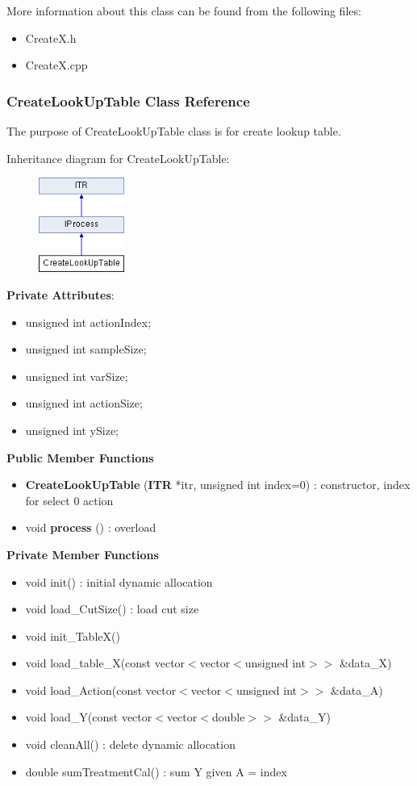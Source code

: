 \documentclass{article}
\begin{document}
More information about this class can be found from the following files:
\begin{itemize}
\item CreateX.h
\item CreateX.cpp
\end{itemize}


\subsubsection{CreateLookUpTable Class Reference}
The purpose of CreateLookUpTable class is for create lookup table.

Inheritance diagram for CreateLookUpTable:
\begin{figure}[H]
\centering
\includegraphics[width=0.25\textwidth]{class_create_look_up_table.png}
\end{figure}

\textbf{Private Attributes}:
\begin{itemize}
\item unsigned int actionIndex;
\item unsigned int sampleSize;
\item unsigned int varSize;
\item unsigned int actionSize;
\item unsigned int ySize;
\end{itemize}

\textbf{Public Member Functions}
\begin{itemize}
\item \textbf{CreateLookUpTable} (\textbf{ITR} *itr, unsigned int index=0) : constructor, index for select 0 action
\item void \textbf{process} () : overload
\end{itemize}

\textbf{Private Member Functions}
\begin{itemize}
\item void init() : initial dynamic allocation
\item void load\_CutSize() : load cut size
\item void init\_TableX()
\item void load\_table\_X(const vector$<$vector$<$unsigned int$>>$ \&data\_X)
\item void load\_Action(const vector$<$vector$<$unsigned int$>>$ \&data\_A)
\item void load\_Y(const vector$<$vector$<$double$>>$ \&data\_Y)
\item void cleanAll() : delete dynamic allocation
\item double sumTreatmentCal() : sum Y given A = index
\end{itemize}
\end{document}
